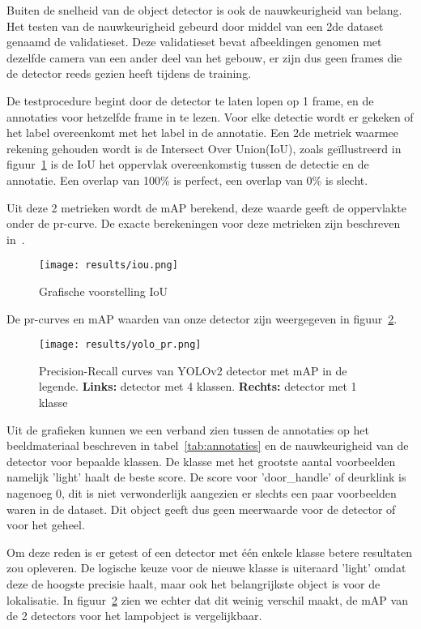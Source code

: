 Buiten de snelheid van de object detector is ook de nauwkeurigheid van belang.
Het testen van de nauwkeurigheid gebeurd door middel van een 2de dataset genaamd de validatieset. Deze validatieset bevat afbeeldingen genomen met dezelfde camera
van een ander deel van het gebouw, er zijn dus geen frames die de detector reeds gezien heeft tijdens de training.

De testprocedure begint door de detector te laten lopen op 1 frame, en de annotaties voor hetzelfde frame in te lezen.
Voor elke detectie wordt er gekeken of het label overeenkomt met het label in de annotatie.
Een 2de metriek waarmee rekening gehouden wordt is de Intersect Over Union(\gls{IoU}), zoals ge\"{i}llustreerd in figuur~\ref{fig:iou} is de \gls{IoU}
het oppervlak overeenkomstig tussen de detectie en de annotatie.
Een overlap van 100\% is perfect, een overlap van 0\% is slecht.

Uit deze 2 metrieken wordt de \gls{mAP} berekend, deze waarde geeft de oppervlakte onder de pr-curve.
De exacte berekeningen voor deze metrieken zijn beschreven in~\cite{everingham2010pascal}.

\begin{figure}[h]
    \centering
    \texttt{[image: results/iou.png]}
    \caption{Grafische voorstelling \gls{IoU}}
    \label{fig:iou}
\end{figure}

De pr-curves en \gls{mAP} waarden van onze detector zijn weergegeven in figuur~\ref{fig:yolo_pr}.

\begin{figure}[h]
    \texttt{[image: results/yolo\_pr.png]}
    \caption{Precision-Recall curves van YOLOv2 detector met mAP in de legende. \textbf{Links:} detector met 4 klassen. \textbf{Rechts:} detector met 1 klasse}
    \label{fig:yolo_pr}
\end{figure}

Uit de grafieken kunnen we een verband zien tussen de annotaties op het beeldmateriaal beschreven in tabel~\ref{tab:annotaties} en de nauwkeurigheid van
de detector voor bepaalde klassen. De klasse met het grootste aantal voorbeelden namelijk 'light' haalt de beste score.
De score voor 'door\_handle' of deurklink is nagenoeg 0, dit is niet verwonderlijk aangezien er slechts een paar voorbeelden waren in de dataset.
Dit object geeft dus geen meerwaarde voor de detector of voor het geheel.

Om deze reden is er getest of een detector met \'{e}\'{e}n enkele klasse betere resultaten zou opleveren.
De logische keuze voor de nieuwe klasse is uiteraard 'light' omdat deze de hoogste precisie haalt, maar ook het belangrijkste object is voor de lokalisatie.
In figuur~\ref{fig:yolo_pr} zien we echter dat dit weinig verschil maakt, de \gls{mAP} van de 2 detectors voor het lampobject is vergelijkbaar.

